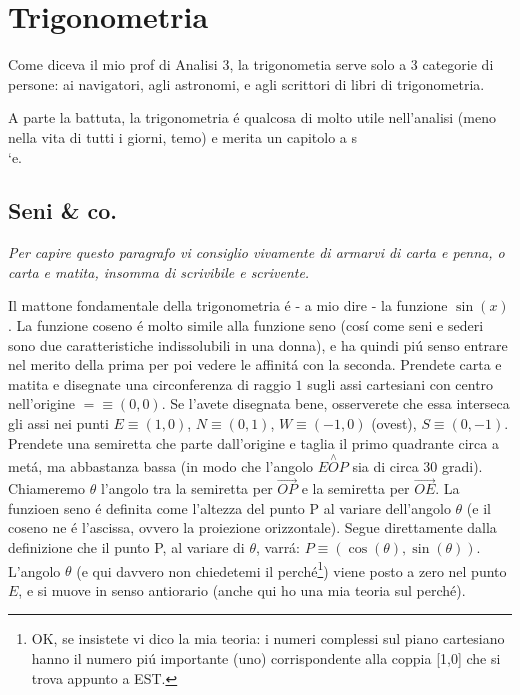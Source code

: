 \chapter{Trigonometria}
\label{trigonometria}
\label{seniecoseni}

Come diceva il mio prof di Analisi 3, la trigonometia serve solo a 3 categorie di persone: ai navigatori, agli astronomi, e agli scrittori di libri di trigonometria.

A parte la battuta, la trigonometria \'e qualcosa di molto utile nell'analisi (meno nella vita di tutti i giorni, temo) e merita un capitolo a s\\`e.

\section{Seni \& co.}

{\em Per capire questo paragrafo vi consiglio vivamente di armarvi di carta e penna, o carta e matita, insomma di scrivibile e scrivente.}

Il mattone fondamentale della trigonometria \'e - a mio dire - la funzione $\sin(x)$. La funzione coseno \'e molto simile alla funzione
seno (cos\'i come seni e sederi sono due caratteristiche indissolubili in una donna), e ha quindi pi\'u senso entrare nel merito della
prima per poi vedere le affinit\'a con la seconda. Prendete carta e matita e disegnate una circonferenza di raggio $1$ sugli assi cartesiani
con centro nell'origine $= \equiv (0,0)$. Se l'avete disegnata bene, osserverete che essa interseca gli assi nei punti $E \equiv (1,0)$, $N \equiv (0,1)$, $W \equiv (-1,0)$
(ovest), $S \equiv (0,-1)$. 
Prendete una semiretta che parte dall'origine e taglia il primo quadrante circa a met\'a, ma abbastanza bassa (in modo che l'angolo $E\stackrel{\wedge}{O}P$ sia di circa 30 gradi). 
Chiameremo $\theta$ l'angolo tra la semiretta per $\overrightarrow{OP}$ e la semiretta per $\overrightarrow{OE}$. La funzioen seno \'e definita
come l'altezza del punto P al variare dell'angolo $\theta$ (e il coseno ne \'e l'ascissa, ovvero la proiezione orizzontale).
Segue direttamente dalla definizione che il punto P, al variare di $\theta$, varr\'a: $P \equiv (\cos(\theta),\sin(\theta))$.
L'angolo $\theta$ (e qui davvero non chiedetemi il perch\'e\footnote{OK, se insistete vi dico la mia teoria: i numeri complessi
	sul piano cartesiano hanno il numero pi\'u importante (uno) corrispondente alla coppia [1,0] che si trova appunto a EST.})
viene posto a zero nel punto $E$, e si muove in senso antiorario (anche qui ho una mia teoria sul perch\'e).

